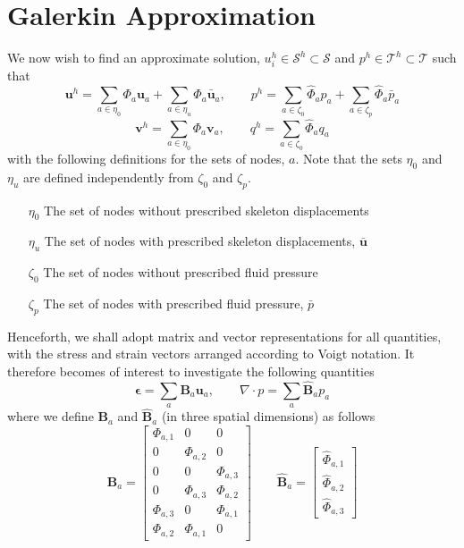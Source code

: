 \documentclass[11pt]{article} %
\begin{document}
\section{Galerkin Approximation}
We now wish to find an approximate solution, $u^h_i \in \mathcal{S}^h \subset \mathcal{S}$ and $p^h \in \mathcal{T}^h \subset \mathcal{T}$ such that
\begin{equation}
	\mathbf{u}^h = \sum_{a \in \eta_0} \Phi_a \mathbf{u}_a + \sum_{a \in \eta_u} \Phi_a \bar{\mathbf{u}}_a, \qquad p^h = \sum_{a \in \zeta_0} \hat{\Phi}_a p_a + \sum_{a \in \zeta_p} \hat{\Phi}_a \bar{p}_a
\end{equation}
\begin{equation}
	\mathbf{v}^h = \sum_{a \in \eta_0} \Phi_a \mathbf{v}_a, \qquad q^h = \sum_{a \in \zeta_0} \hat{\Phi}_a q_a
\end{equation}
with the following definitions for the sets of nodes, $a$. Note that the sets $\eta_0$ and $\eta_u$ are defined independently from $\zeta_0$ and $\zeta_p$.
\begin{itemize}
	\item[$\eta_0$] The set of nodes without prescribed skeleton displacements
	\item[$\eta_u$] The set of nodes with prescribed skeleton displacements, $\bar{\mathbf{u}}$
	\item[$\zeta_0$] The set of nodes without prescribed fluid pressure
	\item[$\zeta_p$] The set of nodes with prescribed fluid pressure, $\bar{p}$
\end{itemize}
Henceforth, we shall adopt matrix and vector representations for all quantities, with the stress and strain vectors arranged according to Voigt notation. It therefore becomes of interest to investigate the following quantities
\begin{equation}
	\mathbf{\epsilon} = \sum_{a} \mathbf{B}_a \mathbf{u}_a, \qquad \nabla \cdot p = \sum_{a} \hat{\mathbf{B}}_a p_a
\end{equation}
where we define $\mathbf{B}_a$ and $\hat{\mathbf{B}}_a$ (in three spatial dimensions) as follows
\begin{equation}
	\mathbf{B}_a = \left[
	\begin{array}{ccc}
		\Phi_{a,1} & 0 & 0 \\
		0 & \Phi_{a,2} & 0 \\
		0 & 0 & \Phi_{a,3} \\
		0 & \Phi_{a,3} & \Phi_{a,2} \\
		\Phi_{a,3} & 0 & \Phi_{a,1} \\
		\Phi_{a,2}& \Phi_{a,1} & 0 
	\end{array} \right]
	\qquad
	\hat{\mathbf{B}}_a = \left[
	\begin{array}{c}
		\hat{\Phi}_{a,1} \\
		\hat{\Phi}_{a,2} \\
		\hat{\Phi}_{a,3}
	\end{array} \right]
\end{equation}
\end{document}
